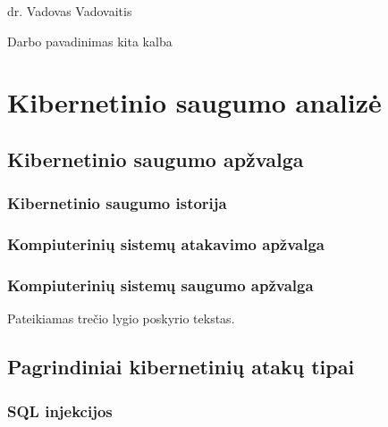 \documentclass[a4paper,12pt,fleqn]{article}
\begin{document}
 {}{}{}{}%
 {dr. Vadovas Vadovaitis}

\tableofcontents



\bothabstracts{}%
{Darbo pavadinimas kita kalba} %
{}%






\newpage
\section{Kibernetinio saugumo analizė}
\label{sec:motivation}
\subsection{Kibernetinio saugumo apžvalga}


\subsubsection{Kibernetinio saugumo istorija}
\subsubsection{Kompiuterinių sistemų atakavimo apžvalga}
\subsubsection{Kompiuterinių sistemų saugumo apžvalga}
\label{sec:data}
Pateikiamas trečio lygio poskyrio tekstas.
\subsection{Pagrindiniai kibernetinių atakų tipai}
\subsubsection{SQL injekcijos}
\end{document}
